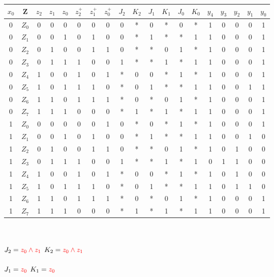 \documentclass[11pt,a4paper]{article}
\begin{document}
\begin{tabular}{c | c | c | c | c | | c | c | c | | c | c | c | c | c | c | | c | c | c | c | c}
$x_0$&Z&$z_2$&$z_1$&$z_0$&$z^+_2$&$z^+_1$&$z^+_0$&$J_2$&$K_2$&$J_1$&$K_1$&$J_0$&$K_0$&$y_4$&$y_3$&$y_2$&$y_1$&$y_0$ \\ \hline
0&$Z_0$&0&0&0&0&0&0&0&*&0&*&0&*&1&0&0&0&1\\
0&$Z_1$&0&0&1&0&1&0&0&*&1&*&*&1&1&0&0&0&1\\
0&$Z_2$&0&1&0&0&1&1&0&*&*&0&1&*&1&0&0&0&1\\
0&$Z_3$&0&1&1&1&0&0&1&*&*&1&*&1&1&0&0&0&1\\
0&$Z_4$&1&0&0&1&0&1&*&0&0&*&1&*&1&0&0&0&1\\
0&$Z_5$&1&0&1&1&1&0&*&0&1&*&*&1&1&0&0&1&1\\
0&$Z_6$&1&1&0&1&1&1&*&0&*&0&1&*&1&0&0&0&1\\
0&$Z_7$&1&1&1&0&0&0&*&1&*&1&*&1&1&0&0&0&1\\ \hline
1&$Z_0$&0&0&0&0&0&1&0&*&0&*&1&*&1&0&0&0&1\\
1&$Z_1$&0&0&1&0&1&0&0&*&1&*&*&1&1&0&0&1&0\\
1&$Z_2$&0&1&0&0&1&1&0&*&*&0&1&*&1&0&1&0&0\\
1&$Z_3$&0&1&1&1&0&0&1&*&*&1&*&1&0&1&1&0&0\\
1&$Z_4$&1&0&0&1&0&1&*&0&0&*&1&*&1&0&1&0&0\\
1&$Z_5$&1&0&1&1&1&0&*&0&1&*&*&1&1&0&1&1&0\\
1&$Z_6$&1&1&0&1&1&1&*&0&*&0&1&*&1&0&0&0&1\\
1&$Z_7$&1&1&1&0&0&0&*&1&*&1&*&1&1&0&0&0&1\\
\end{tabular}\\ \\
$J_2= \textcolor{red}{z_0 \wedge z_1}$
$K_2= \textcolor{red}{z_0 \wedge z_1}$\\\\
$J_1= \textcolor{red}{z_0}$
$K_1= \textcolor{red}{z_0}$\\
\end{document}

